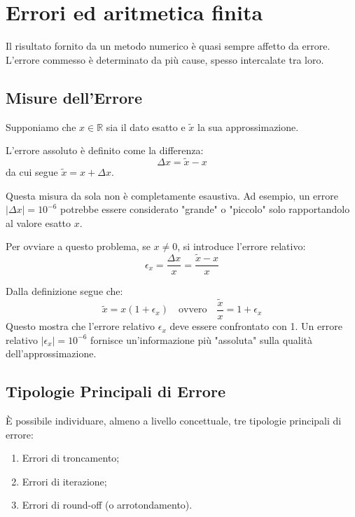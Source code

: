 \section{Errori ed aritmetica finita}

Il risultato fornito da un metodo numerico è quasi sempre affetto da errore. L'errore commesso è determinato da più cause, spesso intercalate tra loro.

\subsection{Misure dell'Errore}
Supponiamo che $x \in \mathbb{R}$ sia il dato esatto e $\tilde{x}$ la sua approssimazione.

\begin{definition}
L'errore assoluto è definito come la differenza:
$$ \Delta x = \tilde{x} - x $$
da cui segue $\tilde{x} = x + \Delta x$.
\end{definition}

Questa misura da sola non è completamente esaustiva. Ad esempio, un errore $|\Delta x| = 10^{-6}$ potrebbe essere considerato "grande" o "piccolo" solo rapportandolo al valore esatto $x$.

\begin{definition}
Per ovviare a questo problema, se $x \neq 0$, si introduce l'errore relativo:
$$ \epsilon_x = \frac{\Delta x}{x} = \frac{\tilde{x} - x}{x} $$
\end{definition}

Dalla definizione segue che:
$$ \tilde{x} = x(1 + \epsilon_x) \quad \text{ovvero} \quad \frac{\tilde{x}}{x} = 1 + \epsilon_x $$
Questo mostra che l'errore relativo $\epsilon_x$ deve essere confrontato con 1. Un errore relativo $|\epsilon_x|=10^{-6}$ fornisce un'informazione più "assoluta" sulla qualità dell'approssimazione.

\subsection{Tipologie Principali di Errore}
È possibile individuare, almeno a livello concettuale, tre tipologie principali di errore:
\begin{enumerate}
    \item Errori di troncamento;
    \item Errori di iterazione;
    \item Errori di round-off (o arrotondamento).
\end{enumerate}

